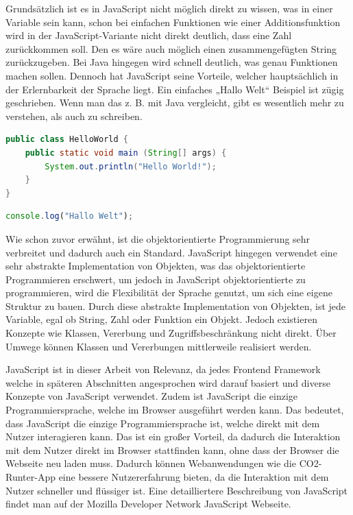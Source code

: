 Grundsätzlich ist es in JavaScript nicht möglich direkt zu wissen, was in einer Variable sein kann, schon bei einfachen Funktionen wie einer Additionsfunktion wird in der JavaScript-Variante nicht direkt deutlich, dass eine Zahl zurückkommen soll. Den es wäre auch möglich einen zusammengefügten String zurückzugeben. Bei Java hingegen wird schnell deutlich, was genau Funktionen machen sollen. Dennoch hat JavaScript seine Vorteile, welcher hauptsächlich in der Erlernbarkeit der Sprache liegt. Ein einfaches „Hallo Welt“ Beispiel ist zügig geschrieben. Wenn man das z. B. mit Java vergleicht, gibt es wesentlich mehr zu verstehen, als auch zu schreiben.

\begin{lstlisting}[caption=„Hallo Welt“ Beispiel in Java, label=hello-world-example-in-java, language=Java]
public class HelloWorld {
	public static void main (String[] args) {
		System.out.println("Hello World!");
	}
}
\end{lstlisting}

\begin{lstlisting}[caption=„Hallo Welt“ Beispiel in JavaScript, label=hello-world-example-in-javascript, language=JavaScript]
    console.log("Hallo Welt");
\end{lstlisting}

Wie schon zuvor erwähnt, ist die objektorientierte Programmierung sehr verbreitet und dadurch auch ein Standard. JavaScript hingegen verwendet eine sehr abstrakte Implementation von Objekten, was das objektorientierte Programmieren erschwert, um jedoch in JavaScript objektorientierte zu programmieren, wird die Flexibilität der Sprache genutzt, um sich eine eigene Struktur zu bauen. Durch diese abstrakte Implementation von Objekten, ist jede Variable, egal ob String, Zahl oder Funktion ein Objekt. Jedoch existieren Konzepte wie Klassen, Vererbung und Zugriffsbeschränkung nicht direkt. Über Umwege können Klassen und Vererbungen mittlerweile realisiert werden.

JavaScript ist in dieser Arbeit von Relevanz, da jedes Frontend Framework welche in späteren Abschnitten angesprochen wird darauf basiert und diverse Konzepte von JavaScript verwendet. Zudem ist JavaScript die einzige Programmiersprache, welche im Browser ausgeführt werden kann. Das bedeutet, dass JavaScript die einzige Programmiersprache ist, welche direkt mit dem Nutzer interagieren kann. Das ist ein großer Vorteil, da dadurch die Interaktion mit dem Nutzer direkt im Browser stattfinden kann, ohne dass der Browser die Webseite neu laden muss. Dadurch können Webanwendungen wie die CO2-Runter-App eine bessere Nutzererfahrung bieten, da die Interaktion mit dem Nutzer schneller und flüssiger ist. Eine detailliertere Beschreibung von JavaScript findet man auf der Mozilla Developer Network JavaScript Webseite.\cite{javascript}

